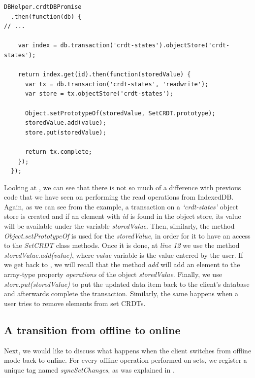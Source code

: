 \begin{lstlisting}[caption={[Applying operation \textit{add} on a set CRDT while offline]Performing an operation \textit{add} on a set CRDT while the client is offline.}, label={lst:dev11}]
DBHelper.crdtDBPromise
  .then(function(db) {
// ...

    var index = db.transaction('crdt-states').objectStore('crdt-states');

    return index.get(id).then(function(storedValue) {
      var tx = db.transaction('crdt-states', 'readwrite');
      var store = tx.objectStore('crdt-states');

      Object.setPrototypeOf(storedValue, SetCRDT.prototype);
      storedValue.add(value);
      store.put(storedValue);

      return tx.complete;
    });
  });
\end{lstlisting}

Looking at , we can see that there is not so much of a difference with previous code that we have seen on performing the read operations from IndexedDB. Again, as we can see from the example, a transaction on a \textit{`crdt-states'} object store is created and if an element with \textit{id} is found in the object store, its value will be available under the variable \textit{storedValue}. Then, similarly, the method \textit{Object.setPrototypeOf} is used for the \textit{storedValue}, in order for it to have an access to the \textit{SetCRDT} class methods. Once it is done, at \textit{line 12} we use the method \textit{storedValue.add(value)}, where \textit{value} variable is the value entered by the user. If we get back to , we will recall that the method \textit{add} will add an element to the array-type property \textit{operations} of the object \textit{storedValue}. Finally, we use \textit{store.put(storedValue)} to put the updated data item back to the client's database and afterwards complete the transaction. Similarly, the same happens when a user tries to remove elements from set CRDTs.

\subsection*{A transition from offline to online}

Next, we would like to discuss what happens when the client switches from offline mode back to online. For every offline operation performed on sets, we register a unique tag named \textit{syncSetChanges}, as was explained in .

